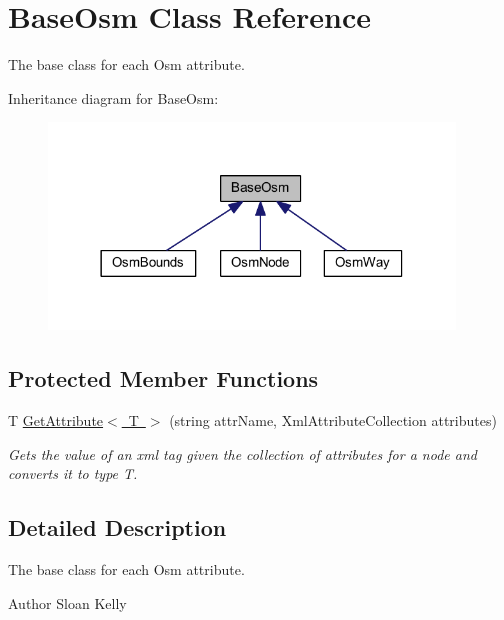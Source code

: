 \hypertarget{class_base_osm}{}\section{Base\+Osm Class Reference}
\label{class_base_osm}


The base class for each Osm attribute.  




Inheritance diagram for Base\+Osm\+:\nopagebreak
\begin{figure}[H]
\begin{center}
\leavevmode
\includegraphics[width=306pt]{class_base_osm__inherit__graph}
\end{center}
\end{figure}
\subsection*{Protected Member Functions}
\begin{DoxyCompactItemize}
\item 
T \mbox{\hyperlink{class_base_osm_a0307011e1ad1fc673bf8111cec1a7d59}{Get\+Attribute$<$ T $>$}} (string attr\+Name, Xml\+Attribute\+Collection attributes)
\begin{DoxyCompactList}\small\item\em Gets the value of an xml tag given the collection of attributes for a node and converts it to type T. \end{DoxyCompactList}\end{DoxyCompactItemize}


\subsection{Detailed Description}
The base class for each Osm attribute. 

\begin{DoxyAuthor}{Author}
Sloan Kelly
\end{DoxyAuthor}


